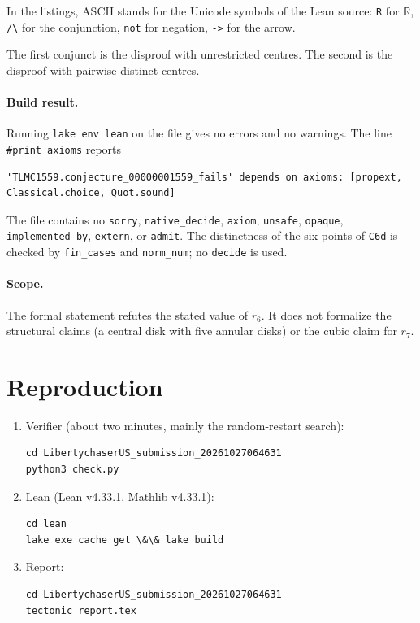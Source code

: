 \documentclass[11pt]{article}
\theoremstyle{definition}
\theoremstyle{plain}
\begin{document}
In the listings, ASCII stands for the Unicode symbols of the Lean source: \texttt{R} for $\mathbb{R}$, \texttt{/\textbackslash} for the conjunction, \texttt{not} for negation, \texttt{->} for the arrow.

The first conjunct is the disproof with unrestricted centres. The second is the disproof with pairwise distinct centres.

\paragraph{Build result.} Running \texttt{lake env lean} on the file gives no errors and no warnings. The line \texttt{\#print axioms} reports
\begin{center}
{\small\begin{lstlisting}
'TLMC1559.conjecture_00000001559_fails' depends on axioms: [propext, Classical.choice, Quot.sound]
\end{lstlisting}}
\end{center}
The file contains no \texttt{sorry}, \texttt{native\_decide}, \texttt{axiom}, \texttt{unsafe}, \texttt{opaque}, \texttt{implemented\_by}, \texttt{extern}, or \texttt{admit}. The distinctness of the six points of \texttt{C6d} is checked by \texttt{fin\_cases} and \texttt{norm\_num}; no \texttt{decide} is used.

\paragraph{Scope.} The formal statement refutes the stated value of $r_6$. It does not formalize the structural claims (a central disk with five annular disks) or the cubic claim for $r_7$.

\section{Reproduction}

\begin{enumerate}
  \item Verifier (about two minutes, mainly the random-restart search):
  \begin{lstlisting}
cd LibertychaserUS_submission_20261027064631
python3 check.py
  \end{lstlisting}
  \item Lean (Lean v4.33.1, Mathlib v4.33.1):
  \begin{lstlisting}
cd lean
lake exe cache get \&\& lake build
  \end{lstlisting}
  \item Report:
  \begin{lstlisting}
cd LibertychaserUS_submission_20261027064631
tectonic report.tex
  \end{lstlisting}
\end{enumerate}
\end{document}
